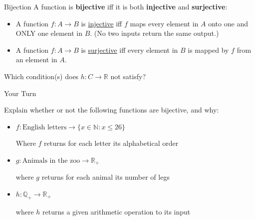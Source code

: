 \documentclass[10pt]{beamer}
\begin{document}
\begin{frame}{Bijection}
A function is \textbf{bijective} iff it is both \textbf{injective} and \textbf{surjective}:

\begin{itemize}
    \item A function $f: A \rightarrow B$ is \underline{injective} iff $f$ maps every element in $A$ onto one and ONLY one element in $B$. (No two inputs return the same output.) \pause
    \item A function $f: A \rightarrow B$ is \underline{surjective} iff every element in $B$ is mapped by $f$ from an element in $A$.

\end{itemize}

Which condition(s) does $h: C \rightarrow \mathbb{R}$ not satisfy?
\end{frame}

\begin{frame}{Your Turn}

Explain whether or not the following functions are bijective, and why:

\begin{itemize}
    \item $f: \text{English letters} \rightarrow \{x \in \mathbb{N}: x \leq 26\}$

    Where $f$ returns for each letter its alphabetical order

    \item $g: \text{Animals in the zoo} \rightarrow \mathbb{R}_+$

    where $g$ returns for each animal its number of legs

    \item $h: \mathbb{Q}_+ \rightarrow \mathbb{R}_+$

    where $h$ returns a given arithmetic operation to its input
\end{itemize}

\end{frame}
\end{document}
